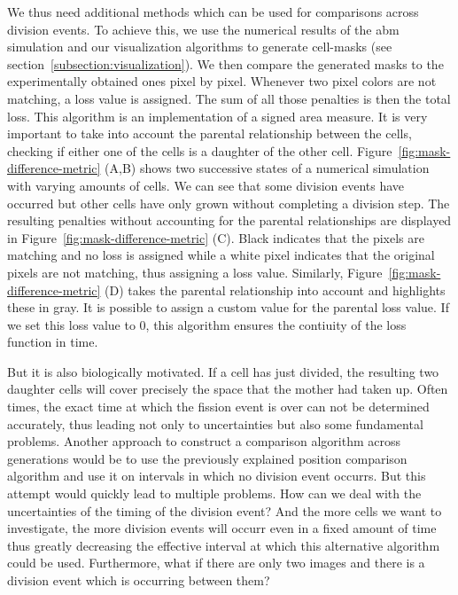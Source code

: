 \documentclass{article}
\begin{document}
We thus need additional methods which can be used for comparisons across division events.
To achieve this, we use the numerical results of the \ac{abm} simulation and our visualization
algorithms to generate cell-masks (see section~\ref{subsection:visualization}).
We then compare the generated masks to the experimentally obtained ones pixel by pixel.
Whenever two pixel colors are not matching, a loss value is assigned.
The sum of all those penalties is then the total loss.
This algorithm is an implementation of a signed area measure.
It is very important to take into account the parental relationship between the cells, checking if
either one of the cells is a daughter of the other cell.
Figure~\ref{fig:mask-difference-metric} (A,B) shows two successive states of a numerical simulation
with varying amounts of cells.
We can see that some division events have occurred but other cells have only grown without
completing a division step.
The resulting penalties without accounting for the parental relationships are displayed in
Figure~\ref{fig:mask-difference-metric} (C).
Black indicates that the pixels are matching and no loss is assigned while a white pixel
indicates that the original pixels are not matching, thus assigning a loss value.
Similarly, Figure~\ref{fig:mask-difference-metric} (D) takes the parental relationship into account
and highlights these in gray.
It is possible to assign a custom value for the parental loss value.
If we set this loss value to $0$, this algorithm ensures the contiuity of the loss function in time.

But it is also biologically motivated.
If a cell has just divided, the resulting two daughter cells will cover precisely the space that the
mother had taken up.
Often times, the exact time at which the fission event is over can not be determined accurately,
thus leading not only to uncertainties but also some fundamental problems.
Another approach to construct a comparison algorithm across generations would be to use the
previously explained position comparison algorithm and use it on intervals in which no division
event occurrs.
But this attempt would quickly lead to multiple problems.
How can we deal with the uncertainties of the timing of the division event?
And the more cells we want to investigate, the more division events will occurr even in a fixed
amount of time thus greatly decreasing the effective interval at which this alternative algorithm
could be used.
Furthermore, what if there are only two images and there is a division event which is occurring
between them?
\end{document}
